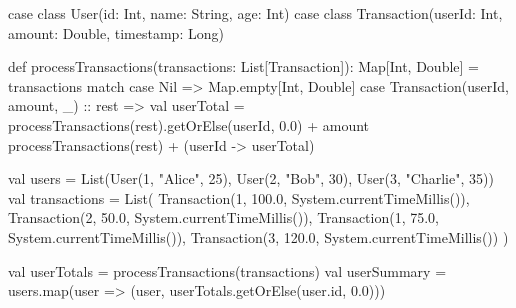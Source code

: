 case class User(id: Int, name: String, age: Int)
case class Transaction(userId: Int, amount: Double, timestamp: Long)

def processTransactions(transactions: List[Transaction]): Map[Int, Double] = transactions match {
  case Nil => Map.empty[Int, Double]
  case Transaction(userId, amount, _) :: rest =>
    val userTotal = processTransactions(rest).getOrElse(userId, 0.0) + amount
    processTransactions(rest) + (userId -> userTotal)
}

val users = List(User(1, "Alice", 25), User(2, "Bob", 30), User(3, "Charlie", 35))
val transactions = List(
  Transaction(1, 100.0, System.currentTimeMillis()),
  Transaction(2, 50.0, System.currentTimeMillis()),
  Transaction(1, 75.0, System.currentTimeMillis()),
  Transaction(3, 120.0, System.currentTimeMillis())
)

val userTotals = processTransactions(transactions)
val userSummary = users.map(user => (user, userTotals.getOrElse(user.id, 0.0)))